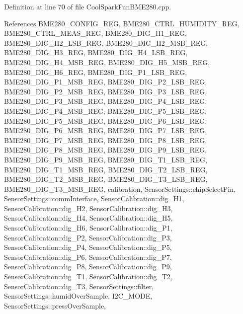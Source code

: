 Definition at line 70 of file Cool\+Spark\+Fun\+B\+M\+E280.\+cpp.



References B\+M\+E280\+\_\+\+C\+O\+N\+F\+I\+G\+\_\+\+R\+EG, B\+M\+E280\+\_\+\+C\+T\+R\+L\+\_\+\+H\+U\+M\+I\+D\+I\+T\+Y\+\_\+\+R\+EG, B\+M\+E280\+\_\+\+C\+T\+R\+L\+\_\+\+M\+E\+A\+S\+\_\+\+R\+EG, B\+M\+E280\+\_\+\+D\+I\+G\+\_\+\+H1\+\_\+\+R\+EG, B\+M\+E280\+\_\+\+D\+I\+G\+\_\+\+H2\+\_\+\+L\+S\+B\+\_\+\+R\+EG, B\+M\+E280\+\_\+\+D\+I\+G\+\_\+\+H2\+\_\+\+M\+S\+B\+\_\+\+R\+EG, B\+M\+E280\+\_\+\+D\+I\+G\+\_\+\+H3\+\_\+\+R\+EG, B\+M\+E280\+\_\+\+D\+I\+G\+\_\+\+H4\+\_\+\+L\+S\+B\+\_\+\+R\+EG, B\+M\+E280\+\_\+\+D\+I\+G\+\_\+\+H4\+\_\+\+M\+S\+B\+\_\+\+R\+EG, B\+M\+E280\+\_\+\+D\+I\+G\+\_\+\+H5\+\_\+\+M\+S\+B\+\_\+\+R\+EG, B\+M\+E280\+\_\+\+D\+I\+G\+\_\+\+H6\+\_\+\+R\+EG, B\+M\+E280\+\_\+\+D\+I\+G\+\_\+\+P1\+\_\+\+L\+S\+B\+\_\+\+R\+EG, B\+M\+E280\+\_\+\+D\+I\+G\+\_\+\+P1\+\_\+\+M\+S\+B\+\_\+\+R\+EG, B\+M\+E280\+\_\+\+D\+I\+G\+\_\+\+P2\+\_\+\+L\+S\+B\+\_\+\+R\+EG, B\+M\+E280\+\_\+\+D\+I\+G\+\_\+\+P2\+\_\+\+M\+S\+B\+\_\+\+R\+EG, B\+M\+E280\+\_\+\+D\+I\+G\+\_\+\+P3\+\_\+\+L\+S\+B\+\_\+\+R\+EG, B\+M\+E280\+\_\+\+D\+I\+G\+\_\+\+P3\+\_\+\+M\+S\+B\+\_\+\+R\+EG, B\+M\+E280\+\_\+\+D\+I\+G\+\_\+\+P4\+\_\+\+L\+S\+B\+\_\+\+R\+EG, B\+M\+E280\+\_\+\+D\+I\+G\+\_\+\+P4\+\_\+\+M\+S\+B\+\_\+\+R\+EG, B\+M\+E280\+\_\+\+D\+I\+G\+\_\+\+P5\+\_\+\+L\+S\+B\+\_\+\+R\+EG, B\+M\+E280\+\_\+\+D\+I\+G\+\_\+\+P5\+\_\+\+M\+S\+B\+\_\+\+R\+EG, B\+M\+E280\+\_\+\+D\+I\+G\+\_\+\+P6\+\_\+\+L\+S\+B\+\_\+\+R\+EG, B\+M\+E280\+\_\+\+D\+I\+G\+\_\+\+P6\+\_\+\+M\+S\+B\+\_\+\+R\+EG, B\+M\+E280\+\_\+\+D\+I\+G\+\_\+\+P7\+\_\+\+L\+S\+B\+\_\+\+R\+EG, B\+M\+E280\+\_\+\+D\+I\+G\+\_\+\+P7\+\_\+\+M\+S\+B\+\_\+\+R\+EG, B\+M\+E280\+\_\+\+D\+I\+G\+\_\+\+P8\+\_\+\+L\+S\+B\+\_\+\+R\+EG, B\+M\+E280\+\_\+\+D\+I\+G\+\_\+\+P8\+\_\+\+M\+S\+B\+\_\+\+R\+EG, B\+M\+E280\+\_\+\+D\+I\+G\+\_\+\+P9\+\_\+\+L\+S\+B\+\_\+\+R\+EG, B\+M\+E280\+\_\+\+D\+I\+G\+\_\+\+P9\+\_\+\+M\+S\+B\+\_\+\+R\+EG, B\+M\+E280\+\_\+\+D\+I\+G\+\_\+\+T1\+\_\+\+L\+S\+B\+\_\+\+R\+EG, B\+M\+E280\+\_\+\+D\+I\+G\+\_\+\+T1\+\_\+\+M\+S\+B\+\_\+\+R\+EG, B\+M\+E280\+\_\+\+D\+I\+G\+\_\+\+T2\+\_\+\+L\+S\+B\+\_\+\+R\+EG, B\+M\+E280\+\_\+\+D\+I\+G\+\_\+\+T2\+\_\+\+M\+S\+B\+\_\+\+R\+EG, B\+M\+E280\+\_\+\+D\+I\+G\+\_\+\+T3\+\_\+\+L\+S\+B\+\_\+\+R\+EG, B\+M\+E280\+\_\+\+D\+I\+G\+\_\+\+T3\+\_\+\+M\+S\+B\+\_\+\+R\+EG, calibration, Sensor\+Settings\+::chip\+Select\+Pin, Sensor\+Settings\+::comm\+Interface, Sensor\+Calibration\+::dig\+\_\+\+H1, Sensor\+Calibration\+::dig\+\_\+\+H2, Sensor\+Calibration\+::dig\+\_\+\+H3, Sensor\+Calibration\+::dig\+\_\+\+H4, Sensor\+Calibration\+::dig\+\_\+\+H5, Sensor\+Calibration\+::dig\+\_\+\+H6, Sensor\+Calibration\+::dig\+\_\+\+P1, Sensor\+Calibration\+::dig\+\_\+\+P2, Sensor\+Calibration\+::dig\+\_\+\+P3, Sensor\+Calibration\+::dig\+\_\+\+P4, Sensor\+Calibration\+::dig\+\_\+\+P5, Sensor\+Calibration\+::dig\+\_\+\+P6, Sensor\+Calibration\+::dig\+\_\+\+P7, Sensor\+Calibration\+::dig\+\_\+\+P8, Sensor\+Calibration\+::dig\+\_\+\+P9, Sensor\+Calibration\+::dig\+\_\+\+T1, Sensor\+Calibration\+::dig\+\_\+\+T2, Sensor\+Calibration\+::dig\+\_\+\+T3, Sensor\+Settings\+::filter, Sensor\+Settings\+::humid\+Over\+Sample, I2\+C\+\_\+\+M\+O\+DE, Sensor\+Settings\+::press\+Over\+Sample, 